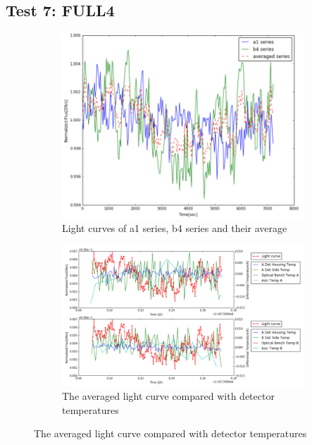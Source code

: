 \documentclass[conference]{IEEEtran}
\begin{document}
\subsection{Test 7: FULL4} 
\begin{figure}[H]
    \centering
    \begin{subfigure}{1}
        \includegraphics[scale=0.4]{ts_test7}
        \caption{Light curves of a1 series, b4 series and their average}
    \end{subfigure}

    \begin{subfigure}{2}
        \includegraphics[scale=0.4]{temp_test7}
        \caption{The averaged light curve compared with detector temperatures}
    \end{subfigure}
   

\end{figure}
\end{document}

